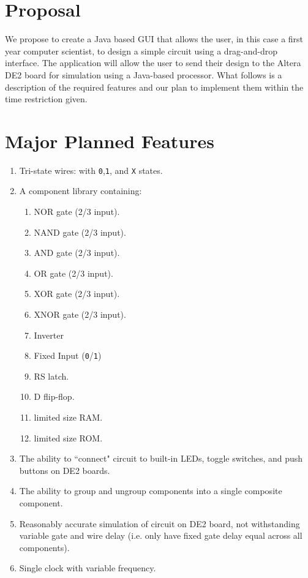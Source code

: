 \documentclass[12pt, a4paper, oneside,titlepage]{article}
\begin{document}
\section{Proposal}
We propose to create a Java based GUI that allows the user, in this case a first year computer scientist, to design a simple circuit using a drag-and-drop interface. The application will allow the user to send their design to the Altera DE2 board for simulation using a Java-based processor.  What follows is a description of the required features and our plan to implement them within the time restriction given.
\section{Major Planned Features}
 \label{sec:majfeat}
\begin{enumerate}
\item Tri-state wires: with \texttt{0},\texttt{1}, and \texttt{X} states.
\item A component library containing:	 \begin{enumerate}
								\item NOR gate (2/3 input).
								\item NAND gate (2/3 input).
								\item AND gate (2/3 input).
								\item OR gate (2/3 input).
								\item XOR gate (2/3 input).
								\item XNOR gate (2/3 input).
								 \item Inverter
								 \item Fixed Input (\texttt{0}/\texttt{1})
								\item RS latch.
								\item D flip-flop.
								\item limited size RAM.
								\item limited size ROM.
								\end{enumerate}
\item The ability to ``connect" circuit to built-in LEDs, toggle switches, and push buttons on DE2 boards.
\item The ability to group and ungroup components into a single composite component.
\item Reasonably accurate simulation of circuit on DE2 board, not withstanding variable gate and wire delay (i.e. only have fixed gate delay equal across all components).
\item Single clock with variable frequency.

\end{enumerate}
\end{document}
